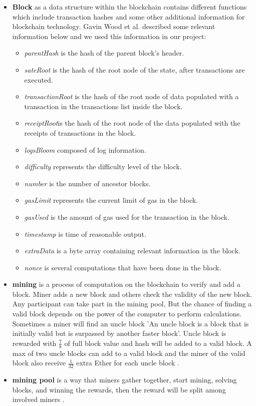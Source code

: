\begin{itemize}
    \item \textbf{Block} as a data structure within the blockchain contains different functions which include transaction hashes and some other additional information for blockchain technology. Gavin Wood et al.\cite{Gavin} described some relevant information below and we used this information in our project: \\
    \begin{itemize}
        \item \textit{parentHash} is the hash of the parent block’s header.
        \item \textit{sateRoot} is the hash of the root node of the state, after transactions are executed.
        \item \textit{transactionRoot} is the hash of the root node of data populated with a transaction in the transactions list inside the block.
        \item \textit{receiptRoot}is the hash of the root node of the data populated with the receipts of transactions in the block.
        \item \textit{logsBloom} composed of log information.
        \item \textit{difficulty} represents the difficulty level of the block.
        \item \textit{number} is the number of ancestor blocks.
        \item \textit{gasLimit} represents the current limit of gas in the block.
        \item \textit{gasUsed} is the amount of gas used for the transaction in the block.
        \item \textit{timestamp} is time of reasonable output.
        \item \textit{extraData} is a byte array containing relevant information in the block.
        \item \textit{nonce} is several computations that have been done in the block.
    \end{itemize}
    \item \textbf{mining} is a process of computation on the blockchain to verify and add a block. Miner adds a new block and others check the validity of the new block. Any participant can take part in the mining pool, But the chance of finding a valid block depends on the power of the computer to perform calculations. Sometimes a miner will find an uncle block 'An uncle block is a block that is initially valid but is surpassed by another faster block'. Uncle block is rewarded with $\frac{7}{8}$ of full block value and hash will be added to a valid block. A max of two uncle blocks can add to a valid block and the miner of the valid block also receive $\frac{1}{32}$ extra Ether for each uncle block \cite{Egbertsen}.
    \item \textbf{mining pool} is a way that miners gather together, start mining, solving blocks, and winning the rewards, then the reward will be split among involved miners \cite{Egbertsen}.
\end{itemize}
